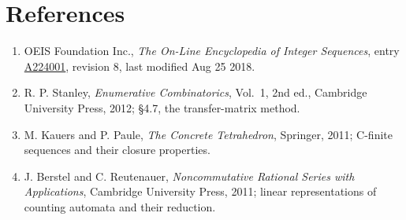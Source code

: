 \documentclass[11pt]{article}
\theoremstyle{definition}
\begin{document}
\section{References}

\begin{enumerate}

\item OEIS Foundation Inc., \emph{The On-Line Encyclopedia of Integer Sequences}, entry \href{https://oeis.org/A224001}{A224001}, revision 8, last modified Aug 25 2018.

\item R. P. Stanley, \emph{Enumerative Combinatorics}, Vol.~1, 2nd ed., Cambridge University Press, 2012; \S4.7, the transfer-matrix method.

\item M. Kauers and P. Paule, \emph{The Concrete Tetrahedron}, Springer, 2011; C-finite sequences and their closure properties.

\item J. Berstel and C. Reutenauer, \emph{Noncommutative Rational Series with Applications}, Cambridge University Press, 2011; linear representations of counting automata and their reduction.

\end{enumerate}
\end{document}
